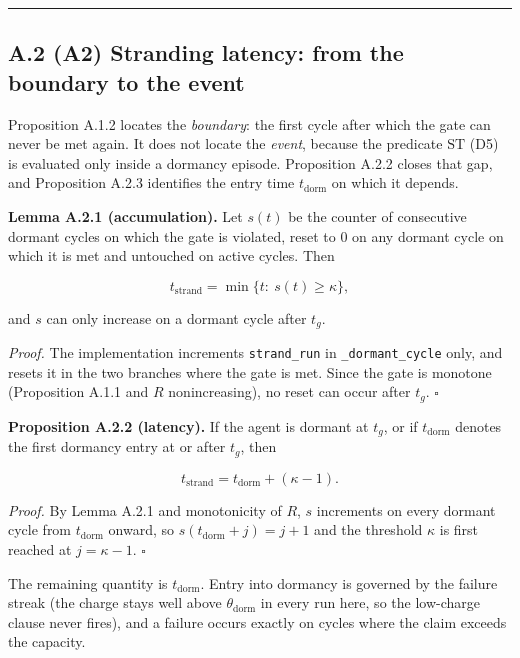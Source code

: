 \documentclass[11pt,a4paper]{article}
\begin{document}
\begin{center}\rule{0.5\linewidth}{0.5pt}\end{center}

\subsection{A.2 (A2) Stranding latency: from the boundary to the event}\label{a.2-a2-stranding-latency-from-the-boundary-to-the-event}

Proposition A.1.2 locates the \emph{boundary}: the first cycle after which the gate can
never be met again. It does not locate the \emph{event}, because the predicate
\(\mathrm{ST}\) (D5) is evaluated only inside a dormancy episode. Proposition A.2.2
closes that gap, and Proposition A.2.3 identifies the entry time \(t_{\mathrm{dorm}}\)
on which it depends.

\textbf{Lemma A.2.1 (accumulation).} Let \(s(t)\) be the counter of consecutive dormant
cycles on which the gate is violated, reset to \(0\) on any dormant cycle on which it
is met and untouched on active cycles. Then

\[
t_{\mathrm{strand}}=\min\{t:\ s(t)\ge\kappa\},
\]

and \(s\) can only increase on a dormant cycle after \(t_g\).

\emph{Proof.} The implementation increments \texttt{strand\_run} in \texttt{\_dormant\_cycle} only, and
resets it in the two branches where the gate is met. Since the gate is monotone
(Proposition A.1.1 and \(R\) nonincreasing), no reset can occur after \(t_g\). \(\square\)

\textbf{Proposition A.2.2 (latency).} If the agent is dormant at \(t_g\), or if
\(t_{\mathrm{dorm}}\) denotes the first dormancy entry at or after \(t_g\), then

\[
t_{\mathrm{strand}}=t_{\mathrm{dorm}}+(\kappa-1).
\]

\emph{Proof.} By Lemma A.2.1 and monotonicity of \(R\), \(s\) increments on every dormant
cycle from \(t_{\mathrm{dorm}}\) onward, so \(s(t_{\mathrm{dorm}}+j)=j+1\) and the
threshold \(\kappa\) is first reached at \(j=\kappa-1\). \(\square\)

The remaining quantity is \(t_{\mathrm{dorm}}\). Entry into dormancy is governed by
the failure streak (the charge stays well above \(\theta_{\mathrm{dorm}}\) in every
run here, so the low-charge clause never fires), and a failure occurs exactly on
cycles where the claim exceeds the capacity.
\end{document}
